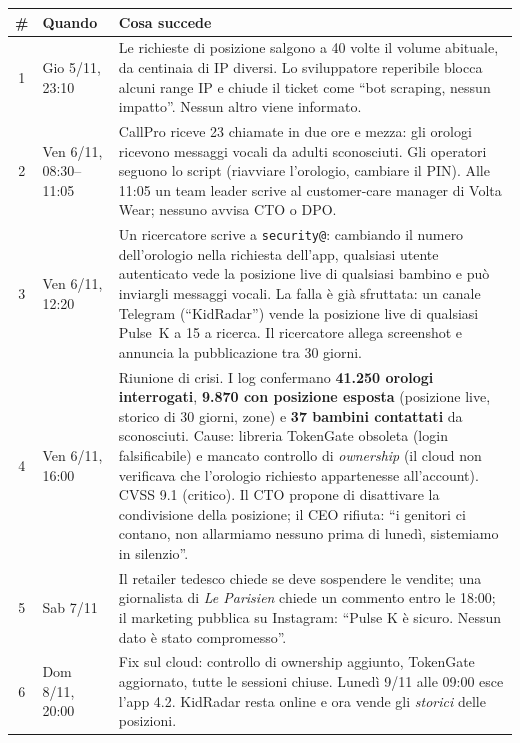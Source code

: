 \begin{center}
\small
\begin{tabularx}{\linewidth}{c p{2.6cm} X}
\toprule
\textbf{\#} & \textbf{Quando} & \textbf{Cosa succede} \\ \midrule
1 & Gio 5/11, 23:10 & Le richieste di posizione salgono a 40 volte il volume abituale, da centinaia
  di IP diversi. Lo sviluppatore reperibile blocca alcuni range IP e chiude il ticket come
  ``bot scraping, nessun impatto''. Nessun altro viene informato. \\ \midrule
2 & Ven 6/11, 08:30--11:05 & CallPro riceve 23 chiamate in due ore e mezza: gli orologi ricevono
  messaggi vocali da adulti sconosciuti. Gli operatori seguono lo script (riavviare l'orologio,
  cambiare il PIN). Alle 11:05 un team leader scrive al customer-care manager di Volta Wear;
  nessuno avvisa CTO o DPO. \\ \midrule
3 & Ven 6/11, 12:20 & Un ricercatore scrive a \texttt{security@}: cambiando il numero dell'orologio
  nella richiesta dell'app, qualsiasi utente autenticato vede la posizione live di qualsiasi bambino
  e può inviargli messaggi vocali. La falla è già sfruttata: un canale Telegram (``KidRadar'') vende
  la posizione live di qualsiasi Pulse~K a \texteuro{}15 a ricerca. Il ricercatore allega screenshot
  e annuncia la pubblicazione tra 30 giorni. \\ \midrule
4 & Ven 6/11, 16:00 & Riunione di crisi. I log confermano \textbf{41.250 orologi interrogati},
  \textbf{9.870 con posizione esposta} (posizione live, storico di 30 giorni, zone) e
  \textbf{37 bambini contattati} da sconosciuti. Cause: libreria TokenGate obsoleta (login
  falsificabile) e mancato controllo di \emph{ownership} (il cloud non verificava che l'orologio
  richiesto appartenesse all'account). CVSS 9.1 (critico). Il CTO propone di disattivare la
  condivisione della posizione; il CEO rifiuta: ``i genitori ci contano, non allarmiamo nessuno prima
  di lunedì, sistemiamo in silenzio''. \\ \midrule
5 & Sab 7/11 & Il retailer tedesco chiede se deve sospendere le vendite; una giornalista di
  \emph{Le Parisien} chiede un commento entro le 18:00; il marketing pubblica su Instagram:
  ``Pulse K è sicuro. Nessun dato è stato compromesso''. \\ \midrule
6 & Dom 8/11, 20:00 & Fix sul cloud: controllo di ownership aggiunto, TokenGate aggiornato, tutte le
  sessioni chiuse. Lunedì 9/11 alle 09:00 esce l'app 4.2. KidRadar resta online e ora vende gli
  \emph{storici} delle posizioni. \\ \bottomrule
\end{tabularx}
\end{center}

